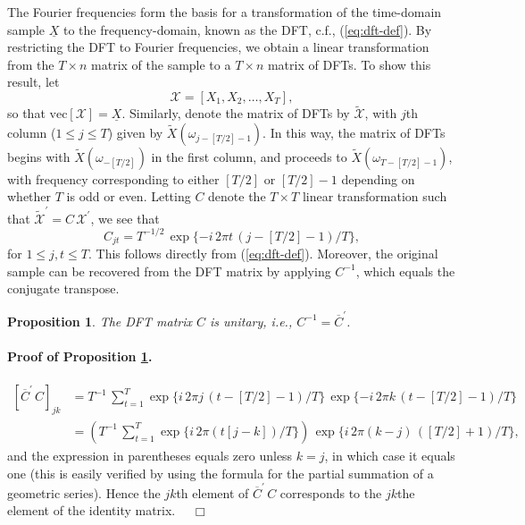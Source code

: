 \documentclass[a4paper]{book}
\newtheorem{Proposition}{Proposition}
\begin{document}
The Fourier frequencies form the basis for a transformation of the time-domain
 sample $\underline{X}$ to the frequency-domain, known as the DFT, c.f., 
 (\ref{eq:dft-def}).  By restricting the DFT to Fourier frequencies, we obtain
 a linear transformation from the $T \times n$ matrix of the sample
 to a $T \times n$ matrix of DFTs.  To show this result, let 
\[
  \mathcal{X} = [ X_1, X_2, \ldots, X_T],
\]
 so that $\mbox{vec} [\mathcal{X}] = \underline{X}$.  Similarly, denote the matrix
 of DFTs by $\widetilde{\mathcal{X}}$, with $j$th column ($1 \leq j \leq T$) 
 given by $\widetilde{X} (\omega_{j - [T/2]-1})$.  In this way, the matrix of 
 DFTs begins with $\widetilde{X} (\omega_{-[T/2]})$ in the first column, and 
 proceeds to $\widetilde{X} (\omega_{T-[T/2]-1})$, with frequency corresponding
 to either $[T/2]$ or $[T/2] -1$ depending on whether $T$ is odd or even.
 Letting $C$ denote the $T \times T$ linear transformation such that
 $\widetilde{\mathcal{X}}^{\prime} = C \, \mathcal{X}^{\prime}$, we see that
\[
  C_{jt} = T^{-1/2} \, \exp \{ - i \, 2 \pi t \, (j- [T/2]-1)/T \},
\]
 for $1 \leq j,t \leq T$.  This follows directly from (\ref{eq:dft-def}).
 Moreover, the original sample can be recovered from the DFT matrix by applying
 $C^{-1}$, which equals the conjugate transpose.

\begin{Proposition}
 \label{prop:dft-unitary}
  The DFT matrix $C$ is unitary, i.e., $C^{-1} = \overline{C}^{\prime}$.
\end{Proposition}

\paragraph{Proof of Proposition \ref{prop:dft-unitary}.}
\begin{align*}
  {\left[ \overline{C}^{\prime} \, C \right] }_{jk} & =
 T^{-1} \, \sum_{t=1}^T \exp \{ i  \, 2 \pi j \, (t-[T/2]-1)/T \} \,
	\exp  \{ - i \, 2 \pi k \, (t - [T/2]-1)/T \} \\
	& = \left( T^{-1} \, \sum_{t=1}^T \exp \{ i \, 2 \pi (t [j-k]) /T \} \right) \,
	\exp \{ i \, 2 \pi (k-j) \, ([T/2]+1)/T \},
\end{align*}
 and the expression in parentheses equals zero unless $k=j$, in which case it equals
 one (this is easily verified by using the formula for the partial summation of a
 geometric series).  Hence  the $jk$th element of $\overline{C}^{\prime} \, C$ 
 corresponds to the $jk$the element of the identity matrix.  $\quad \Box$
\end{document}
